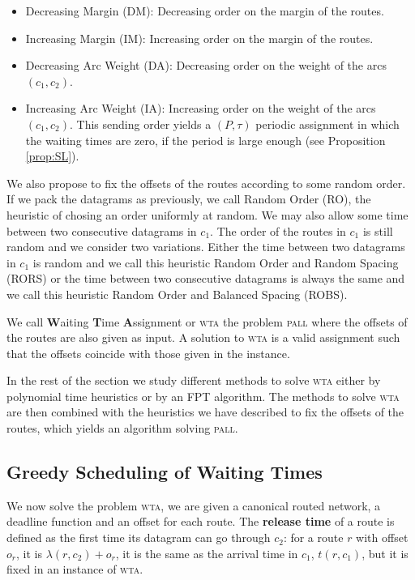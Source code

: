 \documentclass[a4paper,10pt]{journal}
\newcommand\pall{\textsc{pall}\xspace}
\newcommand\wta{\textsc{wta}\xspace}
\begin{document}
	\begin{itemize}
	 \item Decreasing Margin (DM): Decreasing order on the margin of the routes.
	 \item Increasing Margin (IM): Increasing order on the margin of the routes. 
	 \item Decreasing Arc Weight (DA): Decreasing order on the weight of the arcs $(c_1,c_2)$.
	 \item Increasing Arc Weight (IA): Increasing order on the weight of the arcs $(c_1,c_2)$. This sending order yields a $(P,\tau)$ periodic assignment in which the waiting times are zero, if the period is large enough (see Proposition \ref{prop:SL}).
	\end{itemize}

    We also propose to fix the offsets of the routes according to some random order.
    If we pack the datagrams as previously, we call Random Order (RO), the heuristic of chosing an order
    uniformly at random. We may also allow some time between two consecutive datagrams in $c_1$. The order of the routes in $c_1$ is still random and we consider two variations. Either the time between two datagrams in $c_1$ is random and we call this heuristic Random Order and Random Spacing (RORS) or the time between two consecutive datagrams is always the same and we call this heuristic Random Order and Balanced Spacing (ROBS).
 	
 	We call \textbf{W}aiting \textbf{T}ime \textbf{A}ssignment or \wta the problem \pall where the offsets of the routes are also given as input. A solution to \wta
 	is a valid assignment such that the offsets coincide with those given in the instance. 

   In the rest of the section we study different methods to solve \wta either by polynomial time heuristics or by an FPT algorithm. The methods to solve \wta are then combined with the heuristics we have described to fix the offsets of the routes, which yields an algorithm solving \pall.  
   
   \subsection{Greedy Scheduling of Waiting Times}

   We now solve the problem \wta, we are given a canonical routed network, a deadline function and an offset for each route. The \textbf{release time} of a route is defined as the first time its datagram can go through $c_2$: for a route $r$ with offset $o_r$, it is $\lambda(r,c_2) + o_r$, it is the same as the arrival time in $c_1$, $t(r,c_1)$, but it is fixed in an instance of \wta.
\end{document}
